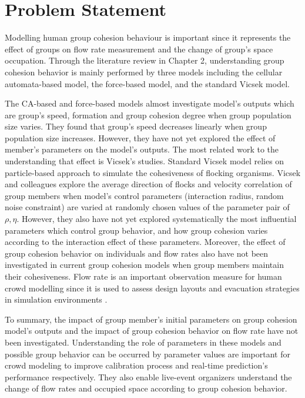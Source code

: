 \documentclass[a4paper,11pt,phdthesis,singlespace,twoside]{cssethesis}
\begin{document}
\section{Problem Statement}
Modelling human group cohesion behaviour is important since it represents the effect of groups on flow rate measurement and the change of group’s space occupation. Through the literature review in Chapter 2, understanding group cohesion behavior is mainly performed by three models including the cellular automata-based model, the force-based model, and the standard Vicsek model. 

The CA-based and force-based models almost investigate model's outputs which are group's speed, formation and group cohesion degree when group population size varies. They found that group's speed decreases linearly when group population size increases. However, they have not yet explored the effect of member's parameters on the model's outputs. The most related work to the understanding that effect is Vicsek's studies. Standard Vicsek model relies on particle-based approach to simulate the cohesiveness of flocking organisms. Vicsek and colleagues explore the average direction of flocks and velocity correlation of group members when model's control parameters (interaction radius, random noise constraint) are varied at randomly chosen values of the parameter pair of $ \rho,\eta $. However, they also have not yet explored systematically the most influential parameters which control group behavior, and how group cohesion varies according to the interaction effect of these parameters. Moreover, the effect of group cohesion behavior on individuals and flow rates also have not been investigated in current group cohesion models when group members maintain their cohesiveness. Flow rate is an important observation measure for human crowd modelling since it is used to assess design layouts and evacuation strategies in simulation environments \cite{Cheng2014}.

To summary, the impact of group member's initial parameters on group cohesion model's outputs and the impact of group cohesion behavior on flow rate have not been investigated. Understanding the role of parameters in these models and possible group behavior can be occurred by parameter values are important for crowd modeling to improve calibration process and real-time prediction’s performance respectively. They also enable live-event organizers understand the change of flow rates and occupied space according to group cohesion behavior. 
\end{document}
